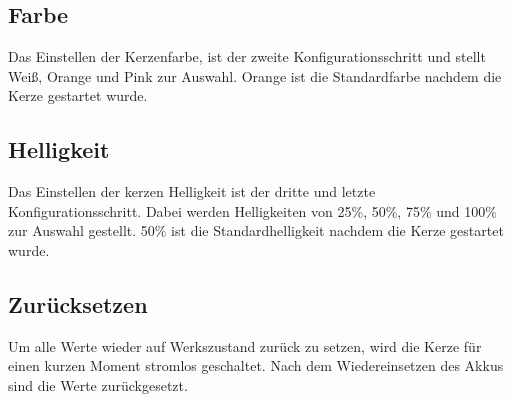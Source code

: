     \subsection{Farbe}
        Das Einstellen der Kerzenfarbe, ist der zweite Konfigurationsschritt
        und stellt Weiß, Orange und Pink zur Auswahl.
        Orange ist die Standardfarbe nachdem die Kerze gestartet wurde.

    \subsection{Helligkeit}
        Das Einstellen der kerzen Helligkeit ist der dritte und letzte Konfigurationsschritt.
        Dabei werden Helligkeiten von 25\%, 50\%, 75\% und 100\% zur Auswahl gestellt.
        50\% ist die Standardhelligkeit nachdem die Kerze gestartet wurde.

    \subsection{Zurücksetzen}
        Um alle Werte wieder auf Werkszustand zurück zu setzen, wird die Kerze 
        für einen kurzen Moment stromlos geschaltet. Nach dem Wiedereinsetzen
        des Akkus sind die Werte zurückgesetzt.
        